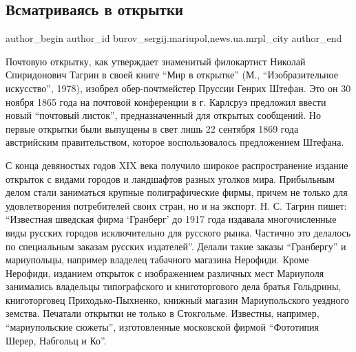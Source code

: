  
 
 
 
 
 
\subsection{Всматриваясь в открытки}
\label{sec:01_04_2018.stz.news.ua.mrpl_city.1.vsmatrivajas_v_otkrytki}
 
\ifcmt
 author_begin
   author_id burov_sergij.mariupol,news.ua.mrpl_city
 author_end
\fi

Почтовую открытку, как утвер­ждает знаменитый филокартист Николай Спиридонович
Тагрин в своей книге \enquote{Мир в открытке} (М., \enquote{Изобразительное искусство}, 1978),
изобрел обер-почтмейстер Пруссии Генрих Штефан. Это он 30 ноября 1865 года на
почтовой конференции в г. Карлсруэ предложил ввести новый \enquote{почтовый листок},
предназначенный для открытых сообщений. Но первые открытки были выпущены в
свет лишь 22 сентября 1869 года австрийским правительством, которое
воспользовалось предложением Штефана.

С конца девяностых годов XIX века получило широкое распространение издание
открыток с видами городов и ландшафтов разных уголков мира. Прибыльным делом
стали заниматься крупные полиграфические фирмы, причем не только для
удовлетворения по­требителей своих стран, но и на экспорт. Н. С. Тагрин пишет:
\enquote{Известная шведская фирма \enquote{Гранберг} до 1917 года издавала многочисленные виды
русских городов исключительно для русского рынка. Частично это делалось по
специальным заказам русских издателей}. Делали  такие заказы \enquote{Гранбергу} и
мариупольцы, например владелец табачного магазина Нерофиди. Кроме Нерофиди,
изданием открыток с изображением различных мест Мариуполя занимались владельцы
типографского и книготоргового дела братья Гольдрины, книготорговец
Приходько-Пыхненко, книжный магазин Мариупольского уездного земства. Печатали
открытки не только в Стокгольме. Известны, например, \enquote{мариупольские сюжеты},
изготовленные московской фирмой \enquote{Фототипия Шерер, Набгольц и Ко}.

